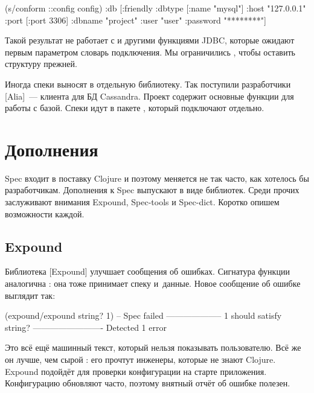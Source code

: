 \begin{clojure/lines}
(s/conform ::config config)
{:db
 [:friendly
  {:dbtype   [:name "mysql"]
   :host     "127.0.0.1"
   :port     [:port 3306]
   :dbname   "project"
   :user     "user"
   :password "********"}]}
\end{clojure/lines}


Такой результат не работает с  и другими функциями JDBC, которые
ожидают первым параметром словарь подключения. Мы ограничились ,
чтобы оставить структуру прежней.

Иногда спеки выносят в отдельную библиотеку. Так поступили разработчики
[Alia]~--- клиента для БД
Cassandra. Проект  содержит основные функции для работы с
базой. Спеки идут в пакете , который подключают
отдельно.

\section{Дополнения}

Spec входит в поставку Clojure и поэтому меняется не так часто, как хотелось бы
разработчикам. Дополнения к Spec выпускают в виде библиотек. Среди прочих
заслуживают внимания Expound, Spec-tools и Spec-dict. Коротко опишем возможности каждой.

\subsection{Expound}

\label{expound}

Библиотека [Expound] улучшает сообщения об
ошибках. Сигнатура функции  аналогична : она
тоже принимает спеку и~данные. Новое сообщение об ошибке выглядит так:



\begin{clojure}
(expound/expound string? 1)
-- Spec failed --------------------
  1
should satisfy
  string?
-------------------------
Detected 1 error
\end{clojure}



Это всё ещё машинный текст, который нельзя показывать пользователю. Всё же он
лучше, чем сырой : его прочтут инженеры, которые не знают
Clojure. Expound подойдёт для проверки конфигурации на старте
приложения. Конфигурацию обновляют часто, поэтому внятный отчёт об ошибке
полезен.

